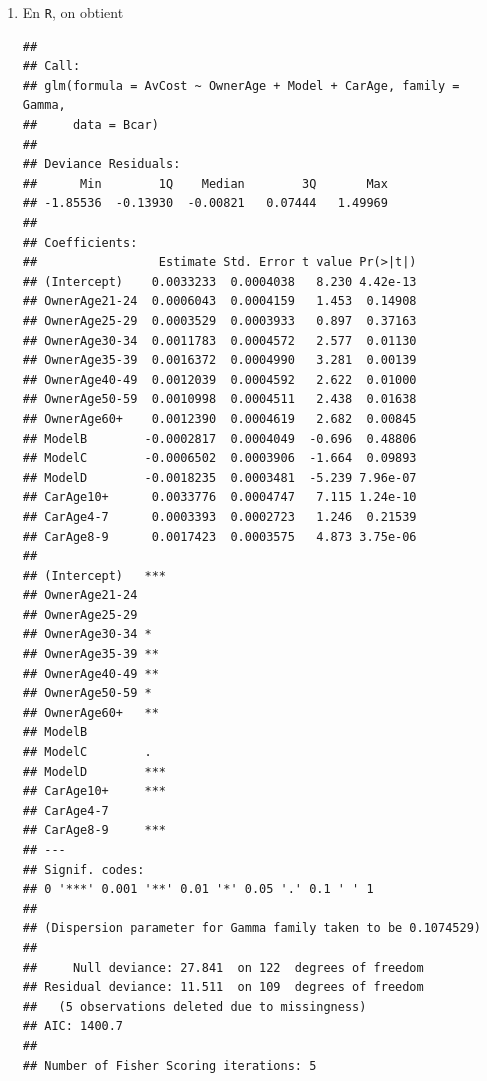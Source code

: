 \begin{solution}{5.8}
\begin{enumerate}
\item En \texttt{R}, on obtient
\begin{knitrout}
\color{fgcolor}\begin{kframe}
\begin{alltt}
 \hlkwb{<-} \hlopt{~}\hlopt{+}\hlopt{+}
\end{alltt}
\begin{verbatim}
##
## Call:
## glm(formula = AvCost ~ OwnerAge + Model + CarAge, family = Gamma,
##     data = Bcar)
##
## Deviance Residuals:
##      Min        1Q    Median        3Q       Max
## -1.85536  -0.13930  -0.00821   0.07444   1.49969
##
## Coefficients:
##                 Estimate Std. Error t value Pr(>|t|)
## (Intercept)    0.0033233  0.0004038   8.230 4.42e-13
## OwnerAge21-24  0.0006043  0.0004159   1.453  0.14908
## OwnerAge25-29  0.0003529  0.0003933   0.897  0.37163
## OwnerAge30-34  0.0011783  0.0004572   2.577  0.01130
## OwnerAge35-39  0.0016372  0.0004990   3.281  0.00139
## OwnerAge40-49  0.0012039  0.0004592   2.622  0.01000
## OwnerAge50-59  0.0010998  0.0004511   2.438  0.01638
## OwnerAge60+    0.0012390  0.0004619   2.682  0.00845
## ModelB        -0.0002817  0.0004049  -0.696  0.48806
## ModelC        -0.0006502  0.0003906  -1.664  0.09893
## ModelD        -0.0018235  0.0003481  -5.239 7.96e-07
## CarAge10+      0.0033776  0.0004747   7.115 1.24e-10
## CarAge4-7      0.0003393  0.0002723   1.246  0.21539
## CarAge8-9      0.0017423  0.0003575   4.873 3.75e-06
##
## (Intercept)   ***
## OwnerAge21-24
## OwnerAge25-29
## OwnerAge30-34 *
## OwnerAge35-39 **
## OwnerAge40-49 **
## OwnerAge50-59 *
## OwnerAge60+   **
## ModelB
## ModelC        .
## ModelD        ***
## CarAge10+     ***
## CarAge4-7
## CarAge8-9     ***
## ---
## Signif. codes:
## 0 '***' 0.001 '**' 0.01 '*' 0.05 '.' 0.1 ' ' 1
##
## (Dispersion parameter for Gamma family taken to be 0.1074529)
##
##     Null deviance: 27.841  on 122  degrees of freedom
## Residual deviance: 11.511  on 109  degrees of freedom
##   (5 observations deleted due to missingness)
## AIC: 1400.7
##
## Number of Fisher Scoring iterations: 5
\end{verbatim}
\end{kframe}
\end{knitrout}


\end{enumerate}
\end{solution}
